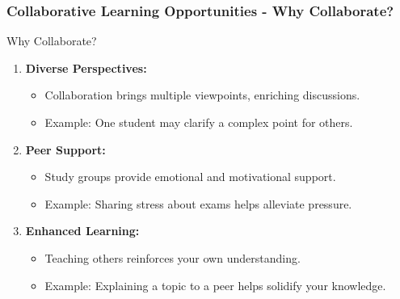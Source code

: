 \documentclass[aspectratio=169]{beamer}
\begin{document}
\begin{frame}[fragile]
    \frametitle{Collaborative Learning Opportunities - Why Collaborate?}
    \begin{block}{Why Collaborate?}
        \begin{enumerate}
            \item \textbf{Diverse Perspectives:}
            \begin{itemize}
                \item Collaboration brings multiple viewpoints, enriching discussions.
                \item Example: One student may clarify a complex point for others.
            \end{itemize}
            
            \item \textbf{Peer Support:}
            \begin{itemize}
                \item Study groups provide emotional and motivational support.
                \item Example: Sharing stress about exams helps alleviate pressure.
            \end{itemize}
            
            \item \textbf{Enhanced Learning:}
            \begin{itemize}
                \item Teaching others reinforces your own understanding.
                \item Example: Explaining a topic to a peer helps solidify your knowledge.
            \end{itemize}
        \end{enumerate}
    \end{block}
\end{frame}
\end{document}
